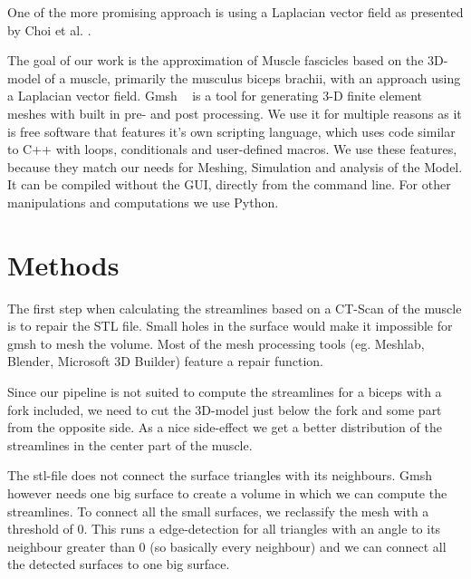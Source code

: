 \documentclass[preprint,journal]{vgtc}       %
\begin{document}
One of the more promising approach is using a Laplacian vector field as presented by Choi et al. \cite{Choi2013}. 

The goal of our work is the approximation of Muscle fascicles based on the 3D-model of a muscle, primarily the musculus biceps brachii, with an approach using a Laplacian vector field. 
Gmsh ~\cite{Geuzaine2009} is a tool for generating 3-D finite element meshes with built in pre- and post processing. 
We use it for multiple reasons as it is free software that features it's own scripting language, which uses code similar to C++ with loops, conditionals and user-defined macros.
We use these features, because they match our needs for Meshing, Simulation and analysis of the Model. 
It can be compiled without the GUI, directly from the command line. 
For other manipulations and computations we use Python.

%
%
%
\section{Methods}
The first step when calculating the streamlines based on a CT-Scan of the muscle is to repair the STL file. 
Small holes in the surface would make it impossible for gmsh to mesh the volume. 
Most of the mesh processing tools (eg. Meshlab, Blender, Microsoft 3D Builder) feature a repair function. %

Since our pipeline is not suited to compute the streamlines for a biceps with a fork included, we need to cut the 3D-model just below the fork and some part from the opposite side.
As a nice side-effect we get a better distribution of the streamlines in the center part of the muscle. %

The stl-file does not connect the surface triangles with its neighbours. 
Gmsh however needs one big surface to create a volume in which we can compute the streamlines. 
To connect all the small surfaces, we reclassify the mesh with a threshold of 0.
This runs a edge-detection for all triangles with an angle to its neighbour greater than 0 (so basically every neighbour) and we can connect all the detected surfaces to one big surface.
\end{document}
